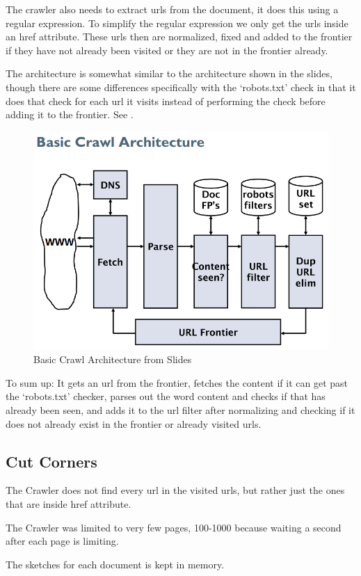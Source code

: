 	The crawler also needs to extract urls from the document, it does this using a regular expression. To simplify the regular expression we only get the urls inside an href attribute. These urls then are normalized, fixed and added to the frontier if they have not already been visited or they are not in the frontier already.
	
	The architecture is somewhat similar to the architecture shown in the slides, though there are some differences specifically with the `robots.txt' check in that it does that check for each url it visits instead of performing the check before adding it to the frontier. See .
	
	\begin{figure}[H]
	\centering
	\includegraphics[width=0.7\linewidth]{./Media/basiccrawlarchitecture}
	\caption{Basic Crawl Architecture from Slides}
	\label{fig:basiccrawlarchitecture}
	\end{figure}
	
	To sum up: It gets an url from the frontier, fetches the content if it can get past the `robots.txt' checker, parses out the word content and checks if that has already been seen, and adds it to the url filter after normalizing and checking if it does not already exist in the frontier or already visited urls.
	
	\subsection{Cut Corners}
	The Crawler does not find every url in the visited urls, but rather just the ones that are inside href attribute.
	
	The Crawler was limited to very few pages, 100-1000 because waiting a second after each page is limiting.
	
	The sketches for each document is kept in memory.
	
